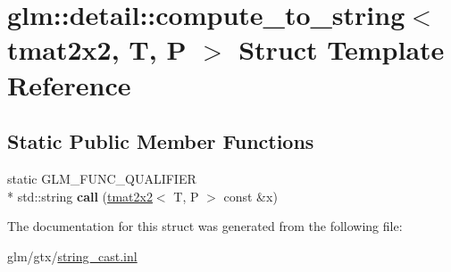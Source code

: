 \hypertarget{structglm_1_1detail_1_1compute__to__string_3_01tmat2x2_00_01T_00_01P_01_4}{\section{glm\-:\-:detail\-:\-:compute\-\_\-to\-\_\-string$<$ tmat2x2, T, P $>$ Struct Template Reference}
\label{structglm_1_1detail_1_1compute__to__string_3_01tmat2x2_00_01T_00_01P_01_4}
}
\subsection*{Static Public Member Functions}
\begin{DoxyCompactItemize}
\item 
\hypertarget{structglm_1_1detail_1_1compute__to__string_3_01tmat2x2_00_01T_00_01P_01_4_a2e35f591c3596c78d4ad73df870dfa10}{static G\-L\-M\-\_\-\-F\-U\-N\-C\-\_\-\-Q\-U\-A\-L\-I\-F\-I\-E\-R \\*
std\-::string {\bfseries call} (\hyperlink{structglm_1_1tmat2x2}{tmat2x2}$<$ T, P $>$ const \&x)}\label{structglm_1_1detail_1_1compute__to__string_3_01tmat2x2_00_01T_00_01P_01_4_a2e35f591c3596c78d4ad73df870dfa10}

\end{DoxyCompactItemize}


The documentation for this struct was generated from the following file\-:\begin{DoxyCompactItemize}
\item 
glm/gtx/\hyperlink{string__cast_8inl}{string\-\_\-cast.\-inl}\end{DoxyCompactItemize}

